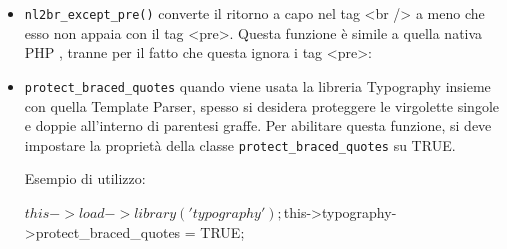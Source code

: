 \begin{itemize}
\begin{code}
$string = $this->typography->auto_typography($string, FALSE);
\end{code}

La formattazione attraverso questa classe può essere molto impegnativa per il processore del proprio server, soprattutto se si hanno molti contenuti da formattare. L'utilizzo di questa funzione è consigliata se abbinata alla funzione di caching per le proprie pagine (si veda la sezione\vref{cap:cache}).

\item \verb|format_characters()| simile alla funzione \verb|auto_typography|, si differenzia per il fatto che è utilizzata solo per la conversione dei caratteri:

\begin{itemize}
\item le doppie virgolette sono convertite con i simboli corretti, tranne se queste appaiono all'interno dei tag.
\item gli apostrofi sono convertiti nel corretto carattere apostrofo
\item i doppi trattini tra le parole come \verb|primo -- ultimo| oppure \verb|primo--ultimo| diventano lineette.
\item tre punti consecutivi, precedenti o successivi una parola vengono convertiti in puntini di sospensione \verb|...|
\item i doppi spazi che segueno una frase vengono convertiti in spazi caratteri che imitare la spaziatura doppino
\end{itemize}

Per esempio:

\begin{code}
$string = $this->typography->format_characters($string);
\end{code}

\item \verb|nl2br_except_pre()| converte il ritorno a capo nel tag <br /> a meno che esso non appaia con il tag <pre>. Questa funzione è simile a quella nativa PHP , tranne per il fatto che questa ignora i tag <pre>:


\item \verb|protect_braced_quotes| quando viene usata la libreria Typography insieme con quella Template Parser, spesso si desidera proteggere le virgolette singole e doppie all'interno di parentesi graffe. Per abilitare questa funzione, si deve impostare la proprietà della classe \verb|protect_braced_quotes| su TRUE. 

Esempio di utilizzo:

\begin{code}
$this->load->library('typography');
$this->typography->protect_braced_quotes = TRUE;
\end{code}
\end{itemize}